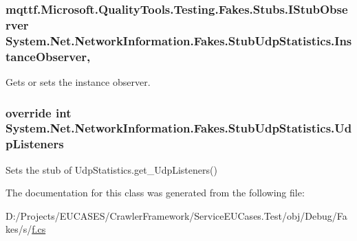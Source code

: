 \hypertarget{class_system_1_1_net_1_1_network_information_1_1_fakes_1_1_stub_udp_statistics_ac655310c2ea2df8396f1a46dfd19f1ab}{
\subsubsection[{Instance\-Observer}]{\setlength{\rightskip}{0pt plus 5cm}mqttf.\-Microsoft.\-Quality\-Tools.\-Testing.\-Fakes.\-Stubs.\-I\-Stub\-Observer System.\-Net.\-Network\-Information.\-Fakes.\-Stub\-Udp\-Statistics.\-Instance\-Observer\hspace{0.3cm}{\ttfamily [get]}, {\ttfamily [set]}}}\label{class_system_1_1_net_1_1_network_information_1_1_fakes_1_1_stub_udp_statistics_ac655310c2ea2df8396f1a46dfd19f1ab}


Gets or sets the instance observer.

\hypertarget{class_system_1_1_net_1_1_network_information_1_1_fakes_1_1_stub_udp_statistics_a5ac5bc6907b4702aa85590d65665982a}{
\subsubsection[{Udp\-Listeners}]{\setlength{\rightskip}{0pt plus 5cm}override int System.\-Net.\-Network\-Information.\-Fakes.\-Stub\-Udp\-Statistics.\-Udp\-Listeners\hspace{0.3cm}{\ttfamily [get]}}}\label{class_system_1_1_net_1_1_network_information_1_1_fakes_1_1_stub_udp_statistics_a5ac5bc6907b4702aa85590d65665982a}


Sets the stub of Udp\-Statistics.\-get\-\_\-\-Udp\-Listeners()



The documentation for this class was generated from the following file\-:\begin{DoxyCompactItemize}
\item 
D\-:/\-Projects/\-E\-U\-C\-A\-S\-E\-S/\-Crawler\-Framework/\-Service\-E\-U\-Cases.\-Test/obj/\-Debug/\-Fakes/s/\hyperlink{s_2f_8cs}{f.\-cs}\end{DoxyCompactItemize}
